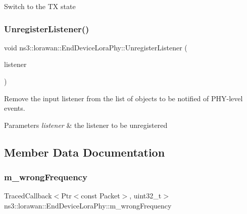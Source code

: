 Switch to the TX state \mbox{\label{classns3_1_1lorawan_1_1EndDeviceLoraPhy_ad1291d05e67b2a00e792f171e7621f75}} 
\subsubsection{\texorpdfstring{Unregister\+Listener()}{UnregisterListener()}}
{\footnotesize\ttfamily void ns3\+::lorawan\+::\+End\+Device\+Lora\+Phy\+::\+Unregister\+Listener (\begin{DoxyParamCaption}\item[{\hyperlink{classns3_1_1lorawan_1_1EndDeviceLoraPhyListener}{End\+Device\+Lora\+Phy\+Listener} $\ast$}]{listener }\end{DoxyParamCaption})}

Remove the input listener from the list of objects to be notified of P\+H\+Y-\/level events.


\begin{DoxyParams}{Parameters}
{\em listener} & the listener to be unregistered \\
\hline
\end{DoxyParams}


\subsection{Member Data Documentation}
\mbox{\label{classns3_1_1lorawan_1_1EndDeviceLoraPhy_af8a4589c87ef5198d5a940d081959d62}} 
\subsubsection{\texorpdfstring{m\+\_\+wrong\+Frequency}{m\_wrongFrequency}}
{\footnotesize\ttfamily Traced\+Callback$<$Ptr$<$const Packet$>$, uint32\+\_\+t$>$ ns3\+::lorawan\+::\+End\+Device\+Lora\+Phy\+::m\+\_\+wrong\+Frequency\hspace{0.3cm}{\ttfamily [protected]}}

